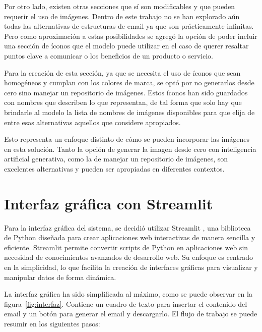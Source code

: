 Por otro lado, existen otras secciones que sí son modificables y que pueden requerir el uso de imágenes. Dentro de este trabajo no se han explorado aún todas las alternativas de estructuras de email ya que son prácticamente infinitas. Pero como aproximación a estas posibilidades se agregó la opción de poder incluir una sección de íconos que el modelo puede utilizar en el caso de querer resaltar puntos clave a comunicar o los beneficios de un producto o servicio.

Para la creación de esta sección, ya que se necesita el uso de íconos que sean homogéneos y cumplan con los colores de marca, se optó por no generarlos desde cero sino manejar un repositorio de imágenes. Estos íconos han sido guardados con nombres que describen lo que representan, de tal forma que solo hay que brindarle al modelo la lista de nombres de imágenes disponibles para que elija de entre esas alternativas aquellos que considere apropiados.

Esto representa un enfoque distinto de cómo se pueden incorporar las imágenes en esta solución. Tanto la opción de generar la imagen desde cero con inteligencia artificial generativa, como la de manejar un repositorio de imágenes, son excelentes alternativas y pueden ser apropiadas en diferentes contextos.

\pagebreak
\section{Interfaz gráfica con Streamlit}

Para la interfaz gráfica del sistema, se decidió utilizar Streamlit \cite{Streamlit}, una biblioteca de Python diseñada para crear aplicaciones web interactivas de manera sencilla y eficiente. Streamlit permite convertir scripts de Python en aplicaciones web sin necesidad de conocimientos avanzados de desarrollo web. Su enfoque es centrado en la simplicidad, lo que facilita la creación de interfaces gráficas para visualizar y manipular datos de forma dinámica.

La interfaz gráfica ha sido simplificada al máximo, como se puede observar en la figura~\ref{fig:interfaz}. Contiene un cuadro de texto para insertar el contenido del email y un botón para generar el email y descargarlo. El flujo de trabajo se puede resumir en los siguientes pasos:

